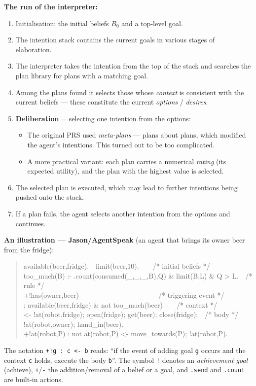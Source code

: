 \documentclass[11pt,a4paper]{article}
\theoremstyle{definition}
\providecommand{\uv}[1]{``#1''}
\begin{document}
\textbf{The run of the interpreter:}
\begin{enumerate}
\item Initialisation: the initial beliefs $B_0$ and a top-level goal.
\item The intention stack contains the current goals in various stages of elaboration.
\item The interpreter takes the intention from the top of the stack and searches the plan library
  for plans with a matching goal.
\item Among the plans found it selects those whose \emph{context} is consistent with the current
  beliefs --- these constitute the current \emph{options} / \emph{desires}.
\item \textbf{Deliberation} = selecting one intention from the options:
  \begin{itemize}
  \item The original PRS used \emph{meta-plans} --- plans about plans, which modified the agent's
    intentions. This turned out to be too complicated.
  \item A more practical variant: each plan carries a numerical \emph{rating} (its expected
    utility), and the plan with the highest value is selected.
  \end{itemize}
\item The selected plan is executed, which may lead to further intentions being pushed onto the
  stack.
\item If a plan fails, the agent selects another intention from the options and continues.
\end{enumerate}

\medskip
\noindent\textbf{An illustration --- Jason/AgentSpeak} (an agent that brings its owner beer from the
fridge):
\begin{quote}\small\ttfamily
\noindent available(beer,fridge).\ \ limit(beer,10).\ \ \ \ /* initial beliefs */\\
too\_much(B) :- .count(consumed(\_,\_,\_,B),Q) \& limit(B,L) \& Q > L.\ \ /* rule */\\[0.3em]
+!has(owner,beer)\ \ \ \ \ \ \ \ \ \ \ \ \ \ \ \ \ \ \ \ \ \ \ /* triggering event */\\
\hspace*{1em}: available(beer,fridge) \& not too\_much(beer)\ \ \ \ /* context */\\
\hspace*{1em}<- !at(robot,fridge); open(fridge); get(beer); close(fridge);\ \ /* body */\\
\hspace*{2em} !at(robot,owner); hand\_in(beer).\\[0.3em]
+!at(robot,P) : not at(robot,P) <- move\_towards(P); !at(robot,P).
\end{quote}
The notation \texttt{+!g : c <- b} reads: \uv{if the event of adding goal \texttt{g} occurs and the
context \texttt{c} holds, execute the body \texttt{b}}. The symbol \texttt{!} denotes an
\emph{achievement goal} (achieve), \texttt{+}/\texttt{-} the addition/removal of a belief or a goal,
and \texttt{.send} and \texttt{.count} are built-in actions.
\end{document}
